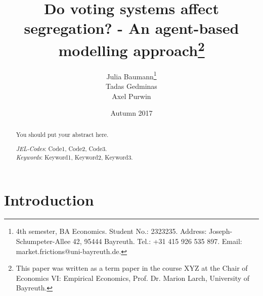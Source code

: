 \documentclass[12pt, a4paper]{article}
\title{{\Large Do voting systems affect segregation? - An agent-based modelling approach\footnote{This paper was written as a term paper in the course XYZ at the Chair of Economics VI: Empirical Economics, Prof. Dr. Marion Larch, University of Bayreuth.}}\\
\vspace{3mm}{\Large Term Paper, Software Engineering for Economists}%
}
\author{Julia Baumann\footnote{4th semester, BA Economics. Student No.: 2323235. Address: Joseph-Schumpeter-Allee 42, 95444 Bayreuth. Tel.: +31 415 926 535 897. Email: market.frictions@uni-bayreuth.de.}\\ Tadas Gedminas\\Axel Purwin}
\date{Autumn 2017}
\begin{document}
\maketitle \thispagestyle{empty}

\begin{abstract}

\setlength{\baselineskip}{10.5pt} 

\vspace{0.5cm} 
\noindent You should put your abstract here. 
\vspace{0.5cm} 

{\normalsize \noindent \emph{JEL-Codes}:  Code1, Code2, Code3.\\ %
\emph{Keywords}: Keyword1, Keyword2, Keyword3.} %
\end{abstract}

\newpage

\thispagestyle{empty}
\tableofcontents
\newpage

\newpage
\thispagestyle{empty}
\listoftables


\newpage
\thispagestyle{empty}
\listoffigures


\newpage


\setcounter{page}{1}%


\section{\label{sec_intro}Introduction}

\end{document}
